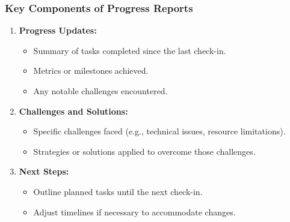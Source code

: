\documentclass[aspectratio=169]{beamer}
\begin{document}
\begin{frame}[fragile]
    \frametitle{Key Components of Progress Reports}
    \begin{enumerate}
        \item \textbf{Progress Updates:}
        \begin{itemize}
            \item Summary of tasks completed since the last check-in.
            \item Metrics or milestones achieved.
            \item Any notable challenges encountered.
        \end{itemize}
        
        \item \textbf{Challenges and Solutions:}
        \begin{itemize}
            \item Specific challenges faced (e.g., technical issues, resource limitations).
            \item Strategies or solutions applied to overcome those challenges.
        \end{itemize}
        
        \item \textbf{Next Steps:}
        \begin{itemize}
            \item Outline planned tasks until the next check-in.
            \item Adjust timelines if necessary to accommodate changes.
        \end{itemize}
    \end{enumerate}
\end{frame}
\end{document}
